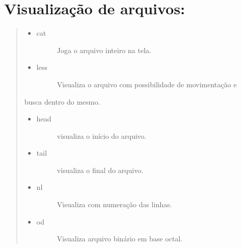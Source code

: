 \documentclass[a4paper,10pt,brazil]{sphinxmanual}
\begin{document}
\section{Visualização de arquivos:}
\label{unix:visualizacao-de-arquivos}\begin{quote}
\begin{itemize}
\item {} \begin{description}
\item[{cat}] \leavevmode
Joga o arquivo inteiro na tela.

\end{description}

\item {} \begin{description}
\item[{less}] \leavevmode
Visualiza o arquivo com possibilidade de movimentação e

\end{description}

\end{itemize}

busca dentro do mesmo.
\begin{itemize}
\item {} \begin{description}
\item[{head}] \leavevmode
visualiza o início do arquivo.

\end{description}

\item {} \begin{description}
\item[{tail}] \leavevmode
visualiza o final do arquivo.

\end{description}

\item {} \begin{description}
\item[{nl}] \leavevmode
Visualiza com numeração das linhas.

\end{description}

\item {} \begin{description}
\item[{od}] \leavevmode
Visualiza arquivo binário em base octal.

\end{description}


\end{itemize}
\end{quote}
\end{document}
